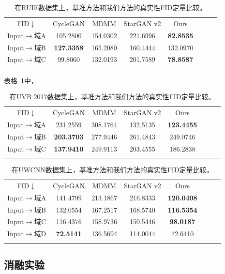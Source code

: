 \begin{table}[ht]
\centering
\caption{在RUIE数据集上，基准方法和我们方法的真实性FID定量比较。}
  \begin{tabular}{c|ccccccc}
    \hline\noalign{\smallskip}
    FID$\downarrow$ & CycleGAN & MDMM & StarGAN v2 & Ours \\
    \noalign{\smallskip}\hline\noalign{\smallskip}
    Input$\rightarrow$域A & 105.2800 & 154.0302 & 221.6996 & \textbf{82.8535}  \\
    Input$\rightarrow$域B & \textbf{127.3358} & 165.2080 & 160.4444 & 132.0970  \\
    Input$\rightarrow$域C & 99.8060 & 132.0193 & 201.7589 & \textbf{78.8587}  \\
    \noalign{\smallskip}\hline
  \end{tabular}
  \label{tab:ruie_domain_fid}
\end{table}

表格~\ref{tab:ruie_domain_fid}中，

\begin{table}[ht]
\centering
\caption{在UVB 2017数据集上，基准方法和我们方法的真实性FID定量比较。}
  \begin{tabular}{c|ccccccc}
    \hline\noalign{\smallskip}
    FID$\downarrow$ & CycleGAN & MDMM & StarGAN v2 & Ours \\
    \noalign{\smallskip}\hline\noalign{\smallskip}
    Input$\rightarrow$域A & 231.2559 & 308.1764 & 132.5135 & \textbf{123.4455}  \\
    Input$\rightarrow$域B & \textbf{203.3703} & 277.9446 & 261.4843 & 249.0746  \\
    Input$\rightarrow$域C & \textbf{137.9410} & 249.9113 & 203.4555 & 186.2838  \\
    \noalign{\smallskip}\hline
  \end{tabular}
  \label{tab:uvb_domain_fid}
\end{table}

\begin{table}[ht]
\centering
\caption{在UWCNN数据集上，基准方法和我们方法的真实性FID定量比较。}
  \begin{tabular}{c|ccccccc}
    \hline\noalign{\smallskip}
    FID$\downarrow$ & CycleGAN & MDMM & StarGAN v2 & Ours \\
    \noalign{\smallskip}\hline\noalign{\smallskip}
    Input$\rightarrow$域A & 141.4799 & 213.1867 & 216.8333 & \textbf{120.0408}  \\
    Input$\rightarrow$域B & 132.0554 & 167.2517 & 168.5740 & \textbf{116.5354}  \\
    Input$\rightarrow$域C & 116.4376 & 158.9736 & 150.5446 & \textbf{98.0187}  \\
    Input$\rightarrow$域D & \textbf{72.5141}  & 136.5694 & 114.0044 & 72.6410  \\
    \noalign{\smallskip}\hline
  \end{tabular}
  \label{tab:uwcnn_domain_fid}
\end{table}

\subsection{消融实验}
